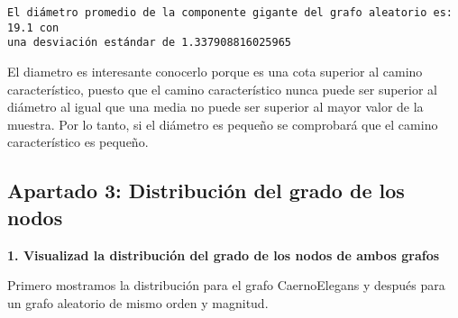 \documentclass[11pt]{article}
\begin{document}
    \begin{Verbatim}[commandchars=\\\{\}]
El diámetro promedio de la componente gigante del grafo aleatorio es: 19.1 con
una desviación estándar de 1.337908816025965
\end{Verbatim}

    El diametro es interesante conocerlo porque es una cota superior al
camino característico, puesto que el camino característico nunca puede
ser superior al diámetro al igual que una media no puede ser superior al
mayor valor de la muestra. Por lo tanto, si el diámetro es pequeño se
comprobará que el camino característico es pequeño.

    \hypertarget{apartado-3-distribuciuxf3n-del-grado-de-los-nodos}{%
\subsection{Apartado 3: Distribución del grado de los
nodos}\label{apartado-3-distribuciuxf3n-del-grado-de-los-nodos}}

    \textbf{1. Visualizad la distribución del grado de los nodos de ambos
grafos}

Primero mostramos la distribución para el grafo CaernoElegans y después
para un grafo aleatorio de mismo orden y magnitud.
\end{document}
